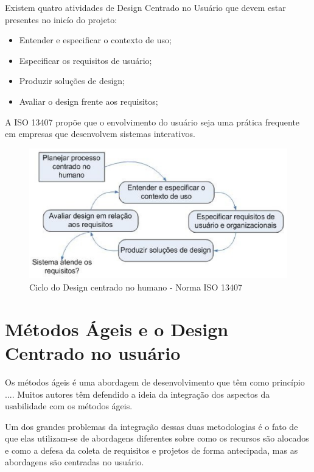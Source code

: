 Existem quatro atividades de Design Centrado no Usuário que devem estar presentes no inicío do projeto:

\begin{itemize}
\item Entender e especificar o contexto de uso;
\item Especificar os requisitos de usuário;
\item Produzir soluções de design;
\item Avaliar o design frente aos requisitos;
\end{itemize}

A ISO 13407 propõe que o envolvimento do usuário seja uma prática frequente em empresas que desenvolvem sistemas interativos.

\begin{figure}[h]
    \centering
    \includegraphics[keepaspectratio=true,scale=0.60]
      {figuras/ciclo_iso13407.eps}
    \caption{Ciclo do Design centrado no humano - Norma ISO 13407~\cite{iso13407}}
    \label{ciclo_iso13407}
\end{figure}




\section{Métodos Ágeis e o Design Centrado no usuário}

	Os métodos ágeis é uma abordagem de desenvolvimento que têm como princípio ....%
Muitos autores têm defendido a ideia da integração dos aspectos da usabilidade com os métodos ágeis.
	
	Um dos grandes problemas da integração dessas duas metodologias é o fato de que elas utilizam-se de abordagens diferentes sobre como os recursos são alocados e como a defesa da coleta de requisitos e projetos de forma antecipada, mas as abordagens são centradas no usuário.

